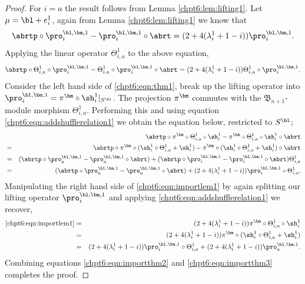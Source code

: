 \documentclass[11pt]{report}
\begin{document}
\begin{proof}
	For $i=a$ the result follows from Lemma \ref{chpt6:lem:lifting1}. Let $\mu = \bl + e_{i}^{1}$, again from Lemma \ref{chpt6:lem:lifting1} we know that 
	\[\abrtp \circ \pro_{i}^{\bl,\bm,1} - \pro_{i}^{\bl,\bm,1}\circ \abrt = (2 + 4(\lambda^{1}_{i} + 1 -i))\pro_{i}^{\bl,\bm,1} .\]
	Applying the linear operator $\Theta_{i,a}^{1}$ to the above equation,
	\begin{eqnarray}
	\abrtp \circ \Theta_{i,a}^{1}\circ \pro_{i}^{\bl,\bm,1} - \Theta_{i,a}^{1}\circ \pro_{i}^{\bl,\bm,1}\circ \abrt = (2 + 4(\lambda^{1}_{i} + 1 -i)) \Theta_{i,a}^{1} \circ \pro_{i}^{\bl,\bm,1} . \label{chpt6:eqn:thm1}
	\end{eqnarray}
	Consider the left hand side of \eqref{chpt6:eqn:thm1}, break up the lifting operator into $\pro_{i}^{\bl,\bm,1} = \pi^{\bm} \circ \sh_{i}^{1}|_{S^{\bl}}$. The projection $\pi^{\bm}$ commutes with the $\mathfrak{B}_{n+1}$-module morphism $\Theta_{i,a}^{1}$. Performing this and using equation \eqref{chpt6:eqn:addshufflerelation1} we obtain the equation below, restricted to $S^{\bl}$;
	\begin{eqnarray}
	&  &\abrtp \circ \pi^{\bm} \circ \Theta_{i,a}^{1}\circ \sh_{i}^{1} - \pi^{\bm} \circ \Theta_{i,a}^{1}\circ \sh_{i}^{1} \circ \abrt  \nonumber\\
	& = &  \abrtp \circ \pi^{\bm} \circ (\sh_{i}^{1}\circ \Theta_{i,a}^{1} + \sh_{i}^{1}) - \pi^{\bm} \circ(\sh_{i}^{1}\circ \Theta_{i,a}^{1} + \sh_{i}^{1}) \circ \abrt  \nonumber\\
	& = & (\abrtp \circ \pro_{a}^{\bl,\bm,1} -\pro_{a}^{\bl,\bm,1} \circ \abrt) + (\abrtp \circ \pro_{i}^{\bl,\bm,1} - \pro_{i}^{\bl,\bm,1} \circ \abrt) \Theta_{i,a}^{1} \nonumber \\ 
	& = &(\abrtp \circ \pro_{a}^{\bl,\bm,1} -\pro_{a}^{\bl,\bm,1} \circ \abrt) + (2 + 4(\lambda_{i}^{1} +1 -i)) \pro_{i}^{\bl,\bm,1} \circ \Theta_{i,a}^{1} \label{chpt6:eqn:importthm2},
	\end{eqnarray}
	Manipulating the right hand side of \eqref{chpt6:eqn:importlem1} by again splitting our lifting operator $\pro_{i}^{\bl,\bm,1}$ and applying \eqref{chpt6:eqn:addshufflerelation1} we recover,
	\begin{eqnarray}
	\eqref{chpt6:eqn:importlem1}  & = &(2 + 4(\lambda^{1}_{i} + 1 -i)) \pi^{\bm}\circ \Theta_{i,a}^{1} \circ \sh_{i}^{1} \nonumber \\
	& = & (2 + 4(\lambda^{1}_{i} + 1 -i)) \pi^{\bm} \circ (\sh_{i}^{1}\circ \Theta_{i,a}^{1} + \sh_{i}^{1}) \nonumber \\
	& = &  (2 + 4(\lambda_{i}^{1} +1 -i)) \pro_{i}^{\bl,\bm,1} \circ \Theta_{i,a}^{1} + (2 + 4(\lambda_{i}^{1} +1 -i)) \pro_{a}^{\bl,\bm,1}. \label{chpt6:eqn:importthm3}
	\end{eqnarray}
	Combining equations \eqref{chpt6:eqn:importthm2} and \eqref{chpt6:eqn:importthm3} completes the proof.
\end{proof}
\end{document}
